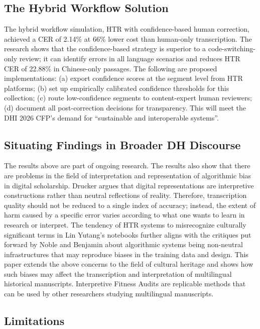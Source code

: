 \documentclass[final]{anthology-ch} %
\begin{document}
\subsection{The Hybrid Workflow Solution}

The hybrid workflow simulation, HTR with confidence-based human correction, achieved a CER of 2.14\% at 66\% lower cost than human-only transcription. The research shows that the confidence-based strategy is superior to a code-switching-only review; it can identify errors in all language scenarios and reduces HTR CER of 22.88\% in Chinese-only passages. The following are proposed implementations: (a) export confidence scores at the segment level from HTR platforms; (b) set up empirically calibrated confidence thresholds for this collection; (c) route low-confidence segments to content-expert human reviewers; (d) document all post-correction decisions for transparency. This will meet the DHI 2026 CFP's demand for \enquote{sustainable and interoperable systems}.

\subsection{Situating Findings in Broader DH Discourse}

The results above are part of ongoing research. The results also show that there are problems in the field of interpretation and representation of algorithmic bias in digital scholarship. Drucker \cite{drucker2011humanities} argues that digital representations are interpretive constructions rather than neutral reflections of reality. Therefore, transcription quality should not be reduced to a single index of accuracy; instead, the extent of harm caused by a specific error varies according to what one wants to learn in research or interpret. The tendency of HTR systems to misrecognize culturally significant terms in Lin Yutang's notebooks further aligns with the critiques put forward by Noble \cite{noble2018algorithms} and Benjamin \cite{benjamin2019race} about algorithmic systems being non-neutral infrastructures that may reproduce biases in the training data and design. This paper extends the above concerns to the field of cultural heritage and shows how such biases may affect the transcription and interpretation of multilingual historical manuscripts. Interpretive Fitness Audits are replicable methods that can be used by other researchers studying multilingual manuscripts.

\subsection{Limitations}
\end{document}
